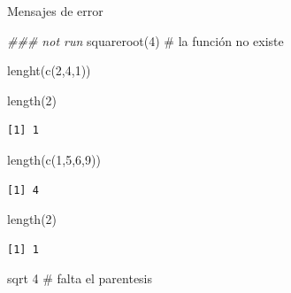 \documentclass[
  ignorenonframetext,
  aspectratio=169,
  spanish,
]{beamer}
\newenvironment{Shaded}{\begin{snugshade}}{\end{snugshade}}
\newcommand{\CommentTok}[1]{\textcolor[rgb]{0.37,0.37,0.37}{#1}}
\newcommand{\DecValTok}[1]{\textcolor[rgb]{0.68,0.00,0.00}{#1}}
\newcommand{\DocumentationTok}[1]{\textcolor[rgb]{0.37,0.37,0.37}{\textit{#1}}}
\newcommand{\FunctionTok}[1]{\textcolor[rgb]{0.28,0.35,0.67}{#1}}
\newcommand{\NormalTok}[1]{\textcolor[rgb]{0.00,0.23,0.31}{#1}}
\begin{document}
\begin{frame}[fragile]{Mensajes de error}
\label{mensajes-de-error-1}
\begin{Shaded}
\begin{Highlighting}[]
\DocumentationTok{\#\#\# not run }
\FunctionTok{squareroot}\NormalTok{(}\DecValTok{4}\NormalTok{)  }\CommentTok{\# la función no existe }
\end{Highlighting}
\end{Shaded}

\begin{Shaded}
\begin{Highlighting}[]
\FunctionTok{lenght}\NormalTok{(}\FunctionTok{c}\NormalTok{(}\DecValTok{2}\NormalTok{,}\DecValTok{4}\NormalTok{,}\DecValTok{1}\NormalTok{)) }
\end{Highlighting}
\end{Shaded}

\begin{Shaded}
\begin{Highlighting}[]
\FunctionTok{length}\NormalTok{(}\DecValTok{2}\NormalTok{)}
\end{Highlighting}
\end{Shaded}

\begin{verbatim}
[1] 1
\end{verbatim}

\begin{Shaded}
\begin{Highlighting}[]
\FunctionTok{length}\NormalTok{(}\FunctionTok{c}\NormalTok{(}\DecValTok{1}\NormalTok{,}\DecValTok{5}\NormalTok{,}\DecValTok{6}\NormalTok{,}\DecValTok{9}\NormalTok{))}
\end{Highlighting}
\end{Shaded}

\begin{verbatim}
[1] 4
\end{verbatim}

\begin{Shaded}
\begin{Highlighting}[]
\FunctionTok{length}\NormalTok{(}\DecValTok{2}\NormalTok{)}
\end{Highlighting}
\end{Shaded}

\begin{verbatim}
[1] 1
\end{verbatim}

\begin{Shaded}
\begin{Highlighting}[]
\NormalTok{sqrt }\DecValTok{4}         \CommentTok{\# falta el parentesis }
\end{Highlighting}
\end{Shaded}


\end{frame}
\end{document}

